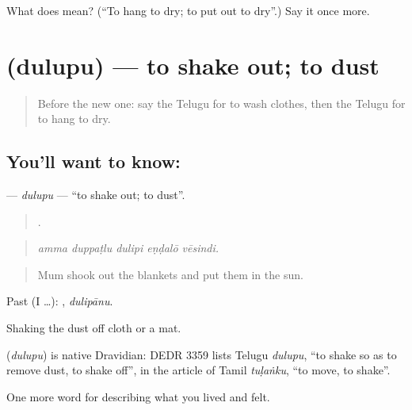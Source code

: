 \begin{tcolorbox}[breakable,colback=teal!4,colframe=teal!35!black,title={Before you move on}]
What does  mean? (\textquotedblleft{}To hang to dry; to put out to dry\textquotedblright{}.) Say it once more.
\end{tcolorbox}
\section[\texorpdfstring{\te{దులుపు} (dulupu)}{దులుపు (dulupu)}]{ (dulupu) — to shake out; to dust}

\label{lesson:TE-C547-dulupu}



\begin{quote}
Before the new one: say the Telugu for to wash clothes, then the Telugu for to hang to dry.
\end{quote}

\subsection*{You'll want to know: }
\textbf{} — \emph{dulupu} — \textquotedblleft{}to shake out; to dust\textquotedblright{}.

\begin{quote}
    .
\end{quote}

\begin{quote}
\emph{amma duppaṭlu dulipi eṇḍalō vēsindi.}
\end{quote}

\begin{quote}
Mum shook out the blankets and put them in the sun.
\end{quote}

Past (I …): , \emph{dulipānu}.

Shaking the dust off cloth or a mat.

\begin{cousinweb}
\textbf{} (\emph{dulupu}) is native Dravidian: DEDR 3359 lists Telugu \emph{dulupu}, \textquotedblleft{}to shake so as to remove dust, to shake off\textquotedblright{}, in the article of Tamil \emph{tuḷaṅku}, \textquotedblleft{}to move, to shake\textquotedblright{}.
\end{cousinweb}

\begin{grammarlens}[title={What you've built}]
One more word for describing what you lived and felt.
\end{grammarlens}


